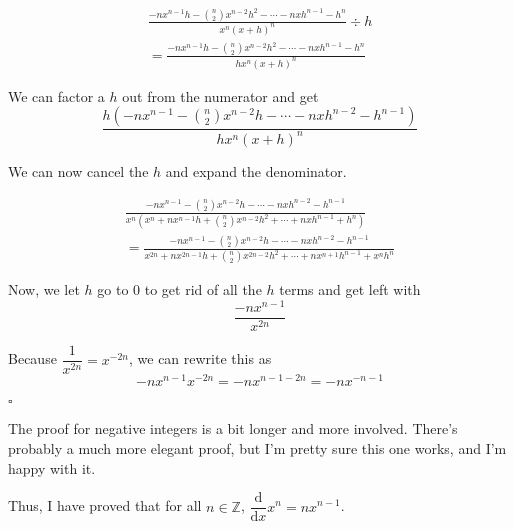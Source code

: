 \documentclass[a4paper]{article}
\newcommand{\deriv}{\dfrac{\text{d}}{\text{d}x}}
\begin{document}
\begin{gather*}
\frac{-nx^{n - 1}h - \binom{n}{2}x^{n - 2}h^2 - \cdots - nxh^{n - 1} - h^n}{x^n(x + h)^n} \div h\\[0.5em]
= \frac{-nx^{n - 1}h - \binom{n}{2}x^{n - 2}h^2 - \cdots - nxh^{n - 1} - h^n}{hx^n(x + h)^n}
\end{gather*}

We can factor a $h$ out from the numerator and get $$\frac{h(-nx^{n - 1} - \binom{n}{2}x^{n - 2}h - \cdots - nxh^{n - 2} - h^{n - 1})}{hx^n(x + h)^n}$$

We can now cancel the $h$ and expand the denominator.

\begin{gather*}
\frac{-nx^{n - 1} - \binom{n}{2}x^{n - 2}h - \cdots - nxh^{n - 2} - h^{n - 1}}{x^n(x^n + nx^{n - 1}h + \binom{n}{2}x^{n - 2}h^2 + \cdots + nxh^{n - 1} + h^n)}\\[0.5em]
= \frac{-nx^{n - 1} - \binom{n}{2}x^{n - 2}h - \cdots - nxh^{n - 2} - h^{n - 1}}{x^{2n} + nx^{2n - 1}h + \binom{n}{2}x^{2n - 2}h^2 + \cdots + nx^{n + 1}h^{n - 1} + x^nh^n}
\end{gather*}

Now, we let $h$ go to 0 to get rid of all the $h$ terms and get left with $$\dfrac{-nx^{n - 1}}{x^{2n}}$$

Because $\dfrac{1}{x^{2n}} = x^{-2n}$, we can rewrite this as $$-nx^{n - 1}x^{-2n} = -nx^{n - 1 - 2n} = -nx^{-n - 1}$$

\hspace*{\fill}$\square$

The proof for negative integers is a bit longer and more involved. There's probably a much more elegant proof, but I'm pretty sure this one works, and I'm happy with it.

Thus, I have proved that for all $n \in \mathbb{Z}$, $\deriv x^n = nx^{n - 1}$.
\end{document}
